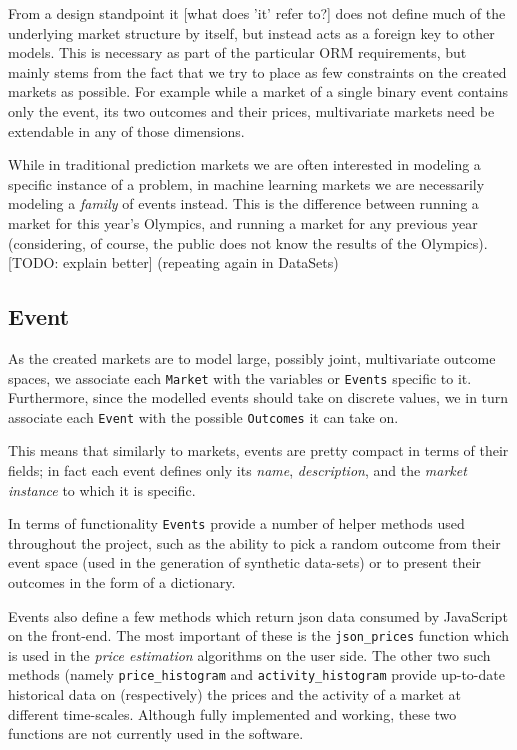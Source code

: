 \documentclass[bsc,frontabs,twoside,singlespacing,parskip,deptreport]{infthesis}     %
\begin{document}
    From a design standpoint it [what does 'it' refer to?] does not define much of the underlying market structure by itself, but instead acts as a foreign key to other models. This is necessary as part of the particular ORM requirements, but mainly stems from the fact that we try to place as few constraints on the created markets as possible. For example while a market of a single binary event contains only the event, its two outcomes and their prices, multivariate markets need be extendable in any of those dimensions. 

       
    While in traditional prediction markets we are often interested in modeling a specific instance of a problem, in machine learning markets we are necessarily modeling a {\em family} of events instead. This is the difference between running a market for this year’s Olympics, and running a market for any previous year (considering, of course, the public does not know the results of the Olympics). [TODO: explain better] (repeating again in DataSets)
    
\subsection{Event}

	As the created markets are to model large, possibly joint, multivariate outcome spaces, we associate each {\tt Market} with the variables or {\tt Events} specific to it. Furthermore, since the modelled events should take on discrete values, we in turn associate each {\tt Event} with the possible {\tt Outcomes} it can take on. 

	This means that similarly to markets, events are pretty compact in terms of their fields; in fact each event defines only its {\em name}, {\em description}, and the {\em market instance} to which it is specific.

	In terms of functionality {\tt Events} provide a number of helper methods used throughout the project, such as the ability to pick a random outcome from their event space (used in the generation of synthetic data-sets) or to present their outcomes in the form of a dictionary. 
	
	Events also define a few methods which return json data consumed by JavaScript on the front-end. The most important of these is the {\tt json\_prices} function which is used in the {\it price estimation} algorithms on the user side. The other two such methods (namely {\tt price\_histogram} and {\tt activity\_histogram} provide up-to-date historical data on (respectively) the prices and the activity of a market at different time-scales. Although fully implemented and working, these two functions are not currently used in the software. 
\end{document}
